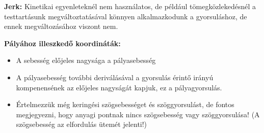\begin{tcolorbox}[colback=MidnightBlue!5!white,colframe=MidnightBlue!60!black,title= Definíció]
\textbf{Jerk:} Kinetikai egyenleteknél nem használatos, de például tömegközlekedésnél a testtartásunk megváltoztatásával könnyen alkalmazkodunk a gyorsuláshoz, de ennek megváltozásához viszont nem.
\end{tcolorbox}
 \textbf{Pályához illeszkedő koordináták:}
\begin{itemize}
    \item A sebesség előjeles nagysága a pályasebesség
    \item A pályasebesség további deriválásával a gyorsulás érintő irányú kompenensének az előjeles nagyságát kapjuk, ez a pályagyorsulás.
    \item Értelmezzük még keringési szögsebességet és szöggyorsulást, de fontos megjegyezni, hogy anyagi pontnak nincs szögsebesség vagy szöggyorsulása! (A szögsebesség az elfordulás ütemét jelenti!)
\end{itemize}
